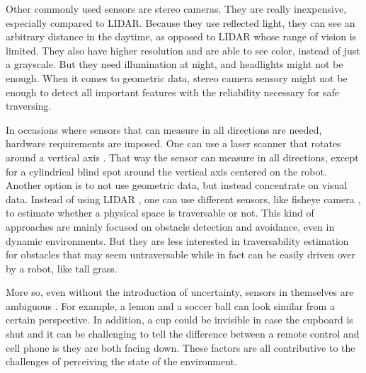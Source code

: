 \documentclass[12pt,a4paper]{report}
\newcommand{\acronym}{\MakeUppercase}
\begin{document}
	Other commonly used sensors are stereo cameras. They are really inexpensive, 
	especially compared to \acronym{lidar}. Because they use reflected light, they 
	can see an arbitrary distance in the daytime, as opposed to \acronym{lidar} 
	whose range of vision is limited. They also have higher resolution and are able 
	to see color, instead of just a grayscale. But they need illumination at night, 
	and headlights might not be enough. When it comes to geometric data, stereo 
	camera sensory might not be enough to detect all important features with the 
	reliability necessary for safe traversing.
	\par
	In occasions where sensors that can measure in all directions are needed, 
	hardware requirements are imposed. One can use a laser scanner that rotates 
	around a vertical axis \citep{Droeschel}. That way the sensor can measure in 
	all directions, except for a cylindrical blind spot around the vertical axis 
	centered on the robot.
	\\
	
	Another option is to not use geometric data, but instead concentrate on visual 
	data. Instead of using \acronym{lidar} \citep{Suger, Lalonde}, one can use 
	different sensors, like fisheye camera \citep{Hirose, HiroseGonet}, 
	to estimate whether a physical space is traversable or not. This kind of 
	approaches are mainly focused on obstacle detection and avoidance, even in 
	dynamic environments. But they are less interested in traversability 
	estimation for obstacles that may seem untraversable while in fact can be 
	easily driven over by a robot, like tall grass.
	\par
	More so, even without the introduction of uncertainty, sensors in themselves are 
	ambiguous \citep{Shabbir}. For example, a lemon and a soccer ball can look 
	similar from a certain perspective. In addition, a cup could be invisible in case 
	the cupboard is shut and it can be challenging to tell the difference between a 
	remote control and cell phone is they are both facing down. These factors are all
	contributive to the challenges of perceiving the state of the environment.
	\\
	
\end{document}
